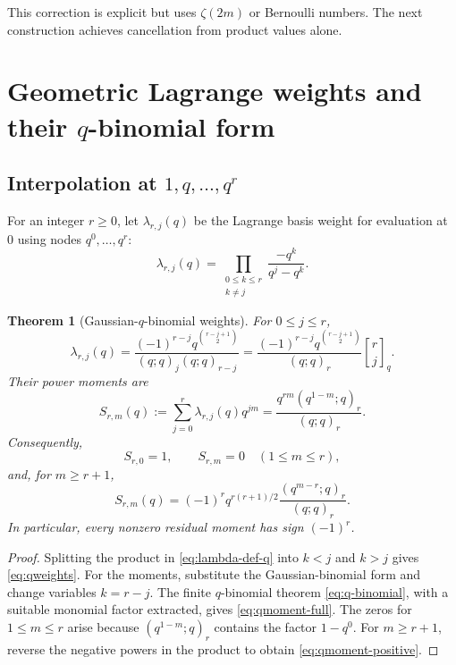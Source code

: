 \documentclass[11pt]{article}
\newtheorem{theorem}{Theorem}[section]
\theoremstyle{definition}
\theoremstyle{remark}
\newcommand{\qbinom}[3]{\genfrac{[}{]}{0pt}{}{#1}{#2}_{#3}}
\begin{document}
This correction is explicit but uses $\zeta(2m)$ or Bernoulli numbers. The next construction achieves cancellation from product values alone.

\section{Geometric Lagrange weights and their \texorpdfstring{$q$}{q}-binomial form}
\label{sec:qweights}

\subsection{Interpolation at \texorpdfstring{$1,q,\ldots,q^r$}{1, q, ..., q-to-the-r}}

For an integer $r\ge0$, let $\lambda_{r,j}(q)$ be the Lagrange basis weight for evaluation at $0$ using nodes $q^0,\ldots,q^r$:
\begin{equation}
\lambda_{r,j}(q)=\prod_{\substack{0\le k\le r\\k\ne j}}
\frac{-q^k}{q^j-q^k}.
\label{eq:lambda-def-q}
\end{equation}

\begin{theorem}[Gaussian-$q$-binomial weights]
\label{thm:qweights}
For $0\le j\le r$,
\begin{equation}
\boxed{
\lambda_{r,j}(q)
=\frac{(-1)^{r-j}q^{\binom{r-j+1}{2}}}
{(q;q)_j(q;q)_{r-j}}
=\frac{(-1)^{r-j}q^{\binom{r-j+1}{2}}}{(q;q)_r}
\qbinom{r}{j}{q}.}
\label{eq:qweights}
\end{equation}
Their power moments are
\begin{equation}
S_{r,m}(q):=\sum_{j=0}^{r}\lambda_{r,j}(q)q^{jm}
=\frac{q^{rm}(q^{1-m};q)_r}{(q;q)_r}.
\label{eq:qmoment-full}
\end{equation}
Consequently,
\begin{equation}
S_{r,0}=1,
\qquad S_{r,m}=0\quad(1\le m\le r),
\label{eq:qmoment-cancel}
\end{equation}
and, for $m\ge r+1$,
\begin{equation}
S_{r,m}(q)
=(-1)^r q^{r(r+1)/2}
\frac{(q^{m-r};q)_r}{(q;q)_r}.
\label{eq:qmoment-positive}
\end{equation}
In particular, every nonzero residual moment has sign $(-1)^r$.
\end{theorem}

\begin{proof}
Splitting the product in \cref{eq:lambda-def-q} into $k<j$ and $k>j$ gives \cref{eq:qweights}. For the moments, substitute the Gaussian-binomial form and change variables $k=r-j$. The finite $q$-binomial theorem \cref{eq:q-binomial}, with a suitable monomial factor extracted, gives \cref{eq:qmoment-full}. The zeros for $1\le m\le r$ arise because $(q^{1-m};q)_r$ contains the factor $1-q^0$. For $m\ge r+1$, reverse the negative powers in the product to obtain \cref{eq:qmoment-positive}.
\end{proof}
\end{document}
